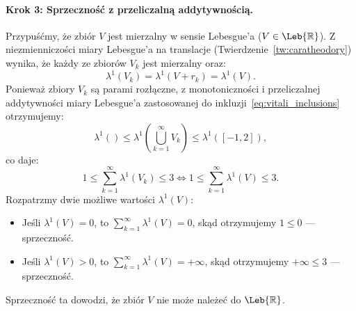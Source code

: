\begin{dow}
    \paragraph{Krok 3: Sprzeczność z przeliczalną addytywnością.}
    Przypuśćmy, że zbiór $V$ jest mierzalny w sensie Lebesgue'a ($V \in \Leb{\mathbb{R}}$).
    Z niezmienniczości miary Lebesgue'a na translacje (Twierdzenie~\ref{tw:caratheodory}) wynika, że każdy ze zbiorów $V_k$ jest mierzalny oraz:
    \begin{equation*}
        \lambda^1(V_k) = \lambda^1(V + r_k) = \lambda^1(V).
    \end{equation*}
    Ponieważ zbiory $V_k$ są parami rozłączne, z monotoniczności i przeliczalnej addytywności miary Lebesgue'a zastosowanej do inkluzji~\eqref{eq:vitali_inclusions} otrzymujemy:
    \begin{equation*}
        \lambda^1() \le \lambda^1\left(\bigcup_{k=1}^\infty V_k\right) \le \lambda^1([-1, 2]),
    \end{equation*}
    co daje:
    \begin{equation*}
        1 \le \sum_{k=1}^\infty \lambda^1(V_k) \le 3 \iff 1 \le \sum_{k=1}^\infty \lambda^1(V) \le 3.
    \end{equation*}
    Rozpatrzmy dwie możliwe wartości $\lambda^1(V)$:
    \begin{itemize}
        \item Jeśli $\lambda^1(V) = 0$, to $\sum_{k=1}^\infty \lambda^1(V) = 0$, skąd otrzymujemy $1 \le 0$ — sprzeczność.
        \item Jeśli $\lambda^1(V) > 0$, to $\sum_{k=1}^\infty \lambda^1(V) = +\infty$, skąd otrzymujemy $+\infty \le 3$ — sprzeczność.
    \end{itemize}
    Sprzeczność ta dowodzi, że zbiór $V$ nie może należeć do $\Leb{\mathbb{R}}$.
\end{dow}
